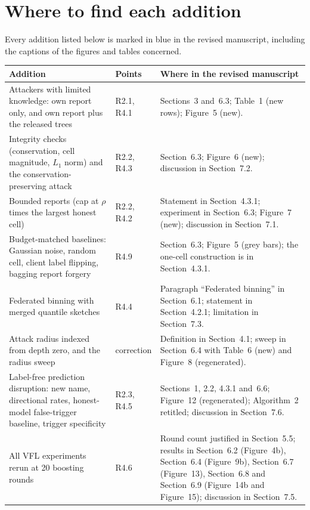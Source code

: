 \documentclass[11pt]{article}
\begin{document}
\section*{Where to find each addition}
Every addition listed below is marked in blue in the revised manuscript, including the captions of the figures and tables concerned.

\small
\begin{longtable}{>{\raggedright\arraybackslash}p{4.1cm}>{\raggedright\arraybackslash}p{1.7cm}>{\raggedright\arraybackslash}p{9.1cm}}
\toprule
\textbf{Addition} & \textbf{Points} & \textbf{Where in the revised manuscript} \\
\midrule
\endhead
Attackers with limited knowledge: own report only, and own report plus the released trees & R2.1, R4.1 & Sections~3 and~6.3; Table~1 (new rows); Figure~5 (new). \\
\addlinespace
Integrity checks (conservation, cell magnitude, $L_1$ norm) and the conservation-preserving attack & R2.2, R4.3 & Section~6.3; Figure~6 (new); discussion in Section~7.2. \\
\addlinespace
Bounded reports (cap at $\rho$ times the largest honest cell) & R2.2, R4.2 & Statement in Section~4.3.1; experiment in Section~6.3; Figure~7 (new); discussion in Section~7.1. \\
\addlinespace
Budget-matched baselines: Gaussian noise, random cell, client label flipping, bagging report forgery & R4.9 & Section~6.3; Figure~5 (grey bars); the one-cell construction is in Section~4.3.1. \\
\addlinespace
Federated binning with merged quantile sketches & R4.4 & Paragraph ``Federated binning'' in Section~6.1; statement in Section~4.2.1; limitation in Section~7.3. \\
\addlinespace
Attack radius indexed from depth zero, and the radius sweep & correction & Definition in Section~4.1; sweep in Section~6.4 with Table~6 (new) and Figure~8 (regenerated). \\
\addlinespace
Label-free prediction disruption: new name, directional rates, honest-model false-trigger baseline, trigger specificity & R2.3, R4.5 & Sections~1, 2.2, 4.3.1 and~6.6; Figure~12 (regenerated); Algorithm~2 retitled; discussion in Section~7.6. \\
\addlinespace
All VFL experiments rerun at 20 boosting rounds & R4.6 & Round count justified in Section~5.5; results in Section~6.2 (Figure~4b), Section~6.4 (Figure~9b), Section~6.7 (Figure~13), Section~6.8 and Section~6.9 (Figure~14b and Figure~15); discussion in Section~7.5. \\

\end{longtable}
\end{document}
